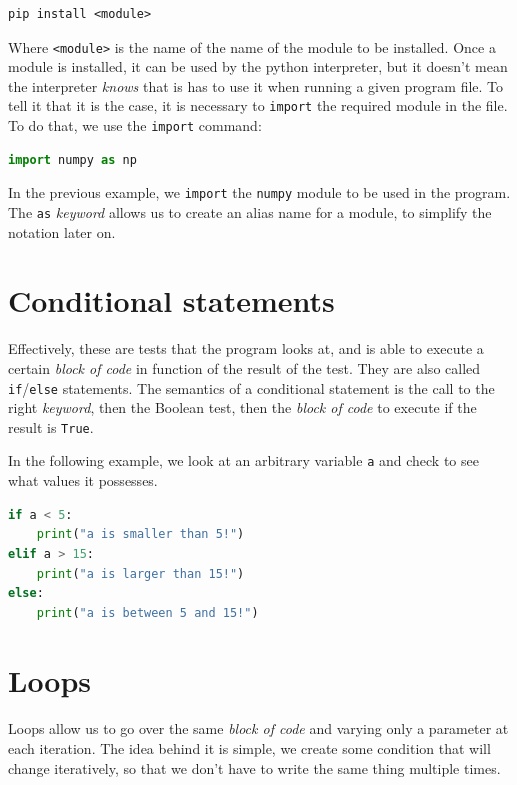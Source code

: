 \documentclass[twocolumn]{article}
\begin{document}
\begin{lstlisting}
pip install <module>
\end{lstlisting}

Where \verb|<module>| is the name of the name of the module to be installed. Once a module is installed, it can be used by the python interpreter, but it doesn't mean the interpreter \emph{knows} that is has to use it when running a given program file. To tell it that it is the case, it is necessary to \verb|import| the required module in the file. To do that, we use the \verb|import| command:

\begin{lstlisting}[language=Python]
import numpy as np
\end{lstlisting}

In the previous example, we \verb|import| the \verb|numpy| module to be used in the program. The \verb|as| \emph{keyword} allows us to create an alias name for a module, to simplify the notation later on.

\section{Conditional statements}

Effectively, these are tests that the program looks at, and is able to execute a certain \emph{block of code} in function of the result of the test. They are also called \verb|if|/\verb|else| statements. The semantics of a conditional statement is the call to the right \emph{keyword}, then the Boolean test, then the \emph{block of code} to execute if the result is \verb|True|.

In the following example, we look at an arbitrary variable \verb|a| and check to see what values it possesses.

\begin{lstlisting}[language=Python]
if a < 5:
    print("a is smaller than 5!")
elif a > 15:
    print("a is larger than 15!")
else:
    print("a is between 5 and 15!")
\end{lstlisting}

\section{Loops}\label{app:loops}

Loops allow us to go over the same \emph{block of code} and varying only a parameter at each iteration. The idea behind it is simple, we create some condition that will change iteratively, so that we don't have to write the same thing multiple times.
\end{document}
